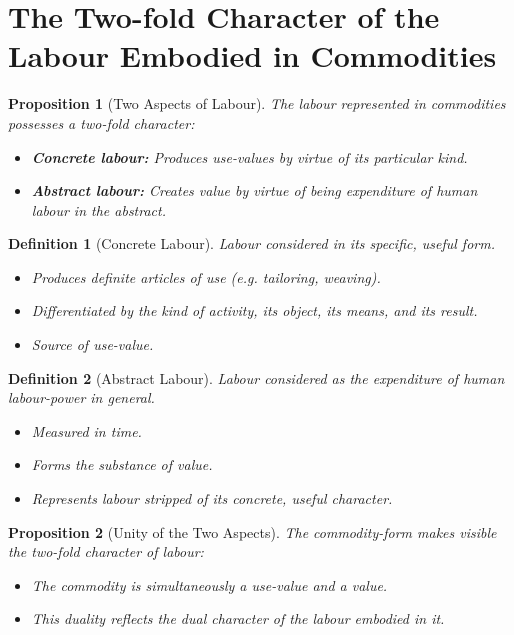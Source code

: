 \documentclass{article}
\newtheorem{innerdef}{Definition}
\newtheorem{innerprop}{Proposition}
\newenvironment{definition}{\begin{innerdef}}{\end{innerdef}}
\newenvironment{proposition}{\begin{innerprop}}{\end{innerprop}}
\begin{document}
\section{The Two-fold Character of the Labour Embodied in Commodities}

\begin{proposition}[Two Aspects of Labour]\label{prop:1.1.2.1}
The labour represented in commodities possesses a two-fold character:
\begin{itemize}[noitemsep]
  \item \textbf{Concrete labour:} Produces use-values by virtue of its particular kind.
  \item \textbf{Abstract labour:} Creates value by virtue of being expenditure of human labour in the abstract.
\end{itemize}
\end{proposition}

\begin{definition}[Concrete Labour]\label{def:1.1.2.1}
Labour considered in its specific, useful form.
\begin{itemize}[noitemsep]
  \item Produces definite articles of use (e.g. tailoring, weaving).
  \item Differentiated by the kind of activity, its object, its means, and its result.
  \item Source of use-value.
\end{itemize}
\end{definition}

\begin{definition}[Abstract Labour]\label{def:1.1.2.2}
Labour considered as the expenditure of human labour-power in general.
\begin{itemize}[noitemsep]
  \item Measured in time.
  \item Forms the substance of value.
  \item Represents labour stripped of its concrete, useful character.
\end{itemize}
\end{definition}

\begin{proposition}[Unity of the Two Aspects]\label{prop:1.1.2.2}
The commodity-form makes visible the two-fold character of labour:
\begin{itemize}[noitemsep]
  \item The commodity is simultaneously a use-value and a value.
  \item This duality reflects the dual character of the labour embodied in it.
\end{itemize}
\end{proposition}
\end{document}
